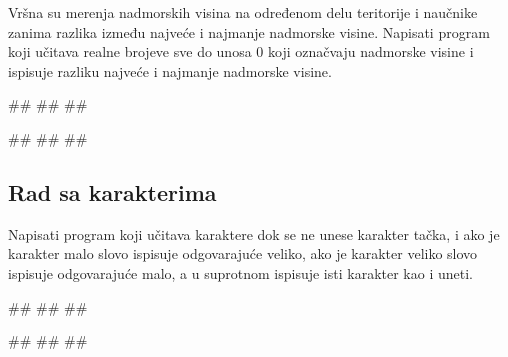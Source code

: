 \begin{Exercise}[label=p1.3_21] 
Vršna su merenja nadmorskih visina na određenom delu teritorije i
naučnike zanima razlika između najveće i najmanje nadmorske
visine. Napisati program koji učitava realne brojeve sve do unosa $0$
koji označvaju nadmorske visine i ispisuje razliku najveće i najmanje
nadmorske visine.

\begin{miditest}
\begin{upotreba}{1}
#\naslovInt#
##
##
\end{upotreba}
\end{miditest}
\begin{miditest}
\begin{upotreba}{2}
#\naslovInt#
##
##
\end{upotreba}
\end{miditest}
\end{Exercise}
\begin{Answer}[ref=p1.3_21]
\end{Answer}


\subsection{Rad sa karakterima}

\begin{Exercise}[label=v1.3_07] 
Napisati program koji učitava karaktere dok se ne unese karakter tačka,
i ako je karakter malo slovo ispisuje odgovarajuće veliko, ako je
karakter veliko slovo ispisuje odgovarajuće malo, a u suprotnom
ispisuje isti karakter kao i uneti.

\begin{miditest}
\begin{upotreba}{1}
#\naslovInt#
##
##
\end{upotreba}
\end{miditest}
\begin{miditest}
\begin{upotreba}{2}
#\naslovInt#
##
##
\end{upotreba}
\end{miditest}
\end{Exercise}
\begin{Answer}[ref=v1.3_07]
\end{Answer}

